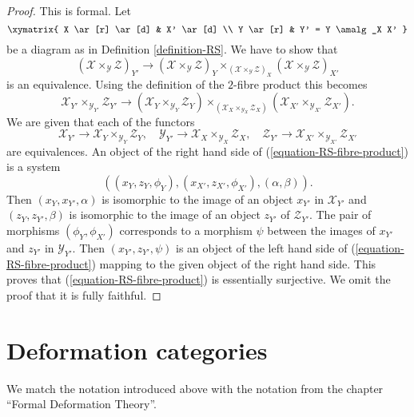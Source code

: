 \begin{proof}
This is formal. Let 
$$
\xymatrix{
X \ar[r] \ar[d] & X' \ar[d] \\
Y \ar[r] & Y' = Y \amalg_X X'
}
$$
be a diagram as in Definition \ref{definition-RS}. We have to show that
$$
(\mathcal{X} \times_{\mathcal{Y}} \mathcal{Z})_{Y'}
\longrightarrow
(\mathcal{X} \times_{\mathcal{Y}} \mathcal{Z})_Y
\times_{(\mathcal{X} \times_{\mathcal{Y}} \mathcal{Z})_X}
(\mathcal{X} \times_{\mathcal{Y}} \mathcal{Z})_{X'}
$$
is an equivalence. Using the definition of the $2$-fibre product
this becomes
\begin{equation}
\label{equation-RS-fibre-product}
\mathcal{X}_{Y'} \times_{\mathcal{Y}_{Y'}} \mathcal{Z}_{Y'}
\longrightarrow
(\mathcal{X}_Y \times_{\mathcal{Y}_Y} \mathcal{Z}_Y)
\times_{(\mathcal{X}_X \times_{\mathcal{Y}_X} \mathcal{Z}_X)}
(\mathcal{X}_{X'} \times_{\mathcal{Y}_{X'}} \mathcal{Z}_{X'}).
\end{equation}
We are given that each of the functors
$$
\mathcal{X}_{Y'} \to \mathcal{X}_Y \times_{\mathcal{Y}_Y} \mathcal{Z}_Y,
\quad
\mathcal{Y}_{Y'} \to \mathcal{X}_X \times_{\mathcal{Y}_X} \mathcal{Z}_X,
\quad
\mathcal{Z}_{Y'} \to
\mathcal{X}_{X'} \times_{\mathcal{Y}_{X'}} \mathcal{Z}_{X'}
$$
are equivalences. An object of the right hand side of
(\ref{equation-RS-fibre-product}) is a system
$$
((x_Y, z_Y, \phi_Y), (x_{X'}, z_{X'}, \phi_{X'}), (\alpha, \beta)).
$$
Then $(x_Y, x_{Y'}, \alpha)$ is isomorphic to the image of an object
$x_{Y'}$ in $\mathcal{X}_{Y'}$ and $(z_Y, z_{Y'}, \beta)$ is isomorphic
to the image of an object $z_{Y'}$ of $\mathcal{Z}_{Y'}$. The pair of
morphisms $(\phi_Y, \phi_{X'})$ corresponds to a morphism $\psi$
between the images of $x_{Y'}$ and $z_{Y'}$ in $\mathcal{Y}_{Y'}$.
Then $(x_{Y'}, z_{Y'}, \psi)$ is an object of the left hand side of
(\ref{equation-RS-fibre-product}) mapping to the given object of the
right hand side. This proves that (\ref{equation-RS-fibre-product}) is
essentially surjective. We omit the proof that it is fully faithful.
\end{proof}





\section{Deformation categories}
\label{section-deformation-categories}

\noindent
We match the notation introduced above with the notation from the
chapter ``Formal Deformation Theory''.

